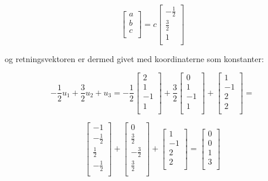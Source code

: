\documentclass[a4paper,12pt]{article}
\begin{document}
\[
\left[\begin{array}{cc}
    a\\
    b\\
    c\\
\end{array}\right]
=
c
\left[\begin{array}{cc}
    -\frac{1}{2}\\
    \frac{3}{2}\\
    1\\
\end{array}\right]
\]

og retningsvektoren er dermed givet med koordinaterne som konstanter:

\[
-\frac{1}{2}u_1 + \frac{3}{2}u_2 + u_3 = 
-\frac{1}{2}
\left[\begin{array}{cc}
    2\\
    1\\
    -1\\
    1\\
\end{array}\right]
+
\frac{3}{2}
\left[\begin{array}{cc}
    0\\
    1\\
    -1\\
    1\\
\end{array}\right]
+
\left[\begin{array}{cc}
    1\\
    -1\\
    2\\
    2\\
\end{array}\right]
=
\]

\[
\left[\begin{array}{cc}
    -1\\
    -\frac{1}{2}\\
    \frac{1}{2}\\
    -\frac{1}{2}\\
\end{array}\right]
+
\left[\begin{array}{cc}
    0\\
    \frac{3}{2}\\
    -\frac{3}{2}\\
    \frac{3}{2}\\
\end{array}\right]
+
\left[\begin{array}{cc}
    1\\
    -1\\
    2\\
    2\\
\end{array}\right]
=
\left[\begin{array}{cc}
    0\\
    0\\
    1\\
    3\\
\end{array}\right]
\]
\end{document}
